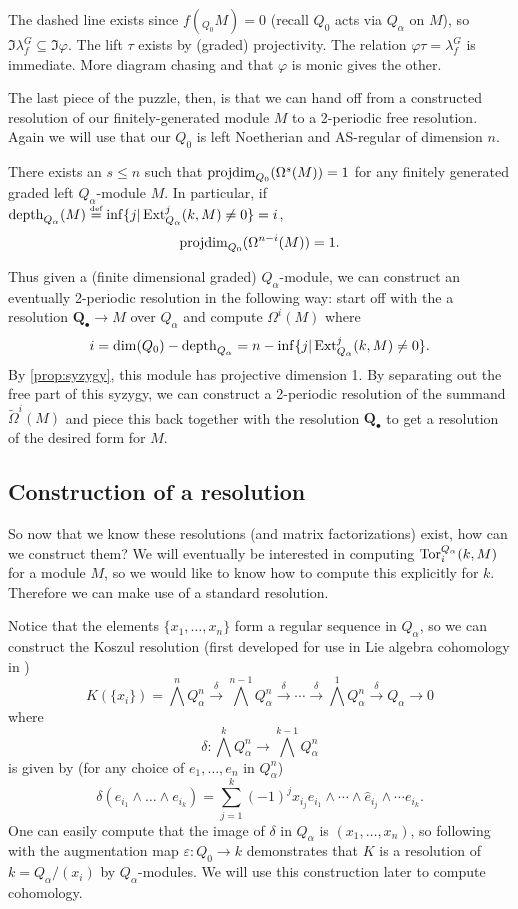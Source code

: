 \documentclass [11pt, proquest] {uwthesis}[2020/02/24]
\begin{document}
    The dashed line exists since $f(_{Q_0}M)=0$ (recall $Q_0$ acts via $Q_\alpha$ on $M$), so $\Im\lambda_f^G\subseteq\Im\varphi$. The lift $\tau$ exists by (graded) projectivity. The relation $\varphi\tau=\lambda_f^G$ is immediate. More diagram chasing and that $\varphi$ is monic gives the other.
    
    The last piece of the puzzle, then, is that we can hand off from a constructed resolution of our finitely-generated module $M$ to a 2-periodic free resolution. Again we will use that our $Q_0$ is left Noetherian and AS-regular of dimension $n$. 
    
    \begin{prop}\label{prop:syzygy}
        There exists an $s\le n$ such that $\operatorname{projdim}_{Q_0}(\Omega^s(M))=1$ for any finitely generated graded left $Q_\alpha$-module $M$. In particular, if $\operatorname{depth}_{Q_\alpha}(M)\stackrel{\text{\tiny def}}{=}\inf\{j|\operatorname{Ext}^j_{Q_\alpha}(k,M)\ne0\}=i$,
        \[\operatorname{projdim}_{Q_0}(\Omega^{n-i}(M))=1.\]
    \end{prop}
    
    Thus given a (finite dimensional graded) $Q_\alpha$-module, we can construct an eventually 2-periodic resolution in the following way: start off with the a resolution $\mathbf{Q}_\bullet\to M$ over $Q_\alpha$ and compute $\Omega^i(M)$ where \[i=\operatorname{dim}(Q_0)-\operatorname{depth}_{Q_\alpha}=n-\inf\{j|\operatorname{Ext}_{Q_\alpha}^j(k,M)\ne 0\}.\]
    By \ref{prop:syzygy}, this module has projective dimension 1. By separating out the free part of this syzygy, we can construct a 2-periodic resolution of the summand $\widetilde\Omega^i(M)$ and piece this back together with the resolution $\mathbf{Q}_\bullet$ to get a resolution of the desired form for $M$.

\subsection{Construction of a resolution}
    So now that we know these resolutions (and matrix factorizations) exist, how can we construct them? We will eventually be interested in computing $\operatorname{Tor}_i^{Q_\alpha}(k,M)$ for a module $M$, so we would like to know how to compute this explicitly for $k$. Therefore we can make use of a standard resolution.
    
    Notice that the elements $\{x_1 ,\dots, x_n \}$ form a regular sequence in $Q_\alpha$, so we can construct the Koszul resolution (first developed for use in Lie algebra cohomology in \cite{koszul-resolution})
    \[K(\{x_i\})=\bigwedge^n Q_\alpha^n\xrightarrow{\delta} \bigwedge^{n-1}Q_\alpha^n\xrightarrow{\delta}\cdots\xrightarrow{\delta}\bigwedge^1 Q_\alpha^n\xrightarrow{\delta} Q_\alpha\to 0\]
    where
    \[\delta:\bigwedge^k Q_\alpha^n\to \bigwedge^{k-1}Q_\alpha^n\]
    is given by (for any choice of $e_1,\dots,e_n$ in $Q_\alpha^n$)
    \[\delta(e_{i_1}\wedge\dots\wedge e_{i_k})=\sum_{j=1}^k (-1)^jx_{i_j} e_{i_1}\wedge\cdots\wedge\hat e_{i_j}\wedge\cdots e_{i_k}.\]
    One can easily compute that the image of $\delta$ in $Q_\alpha$ is $(x_1,\dots,x_n)$, so following with the augmentation map $\varepsilon:Q_0\to k$ demonstrates that $K$ is a resolution of $k=Q_\alpha/(x_i)$ by $Q_\alpha$-modules. We will use this construction later to compute cohomology.
\end{document}
